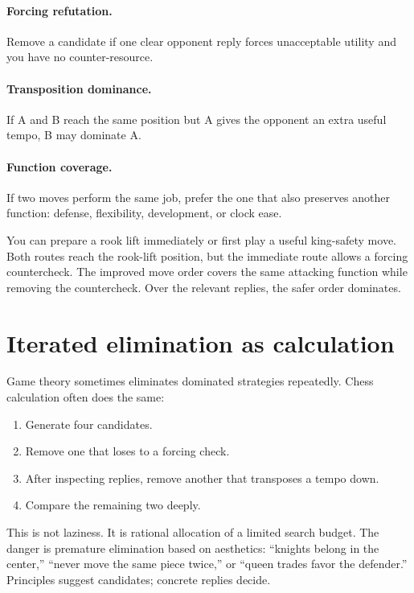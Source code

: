 \paragraph{Forcing refutation.} Remove a candidate if one clear opponent reply forces unacceptable utility and you have no counter-resource.

\paragraph{Transposition dominance.} If A and B reach the same position but A gives the opponent an extra useful tempo, B may dominate A.

\paragraph{Function coverage.} If two moves perform the same job, prefer the one that also preserves another function: defense, flexibility, development, or clock ease.

\begin{workedbox}[title={Worked example: same square, different order}]
You can prepare a rook lift immediately or first play a useful king-safety move. Both routes reach the rook-lift position, but the immediate route allows a forcing countercheck. The improved move order covers the same attacking function while removing the countercheck. Over the relevant replies, the safer order dominates.
\end{workedbox}

\section{Iterated elimination as calculation}
Game theory sometimes eliminates dominated strategies repeatedly. Chess calculation often does the same:

\begin{enumerate}[leftmargin=1.4em]
\item Generate four candidates.
\item Remove one that loses to a forcing check.
\item After inspecting replies, remove another that transposes a tempo down.
\item Compare the remaining two deeply.
\end{enumerate}

This is not laziness. It is rational allocation of a limited search budget. The danger is premature elimination based on aesthetics: ``knights belong in the center,'' ``never move the same piece twice,'' or ``queen trades favor the defender.'' Principles suggest candidates; concrete replies decide.

